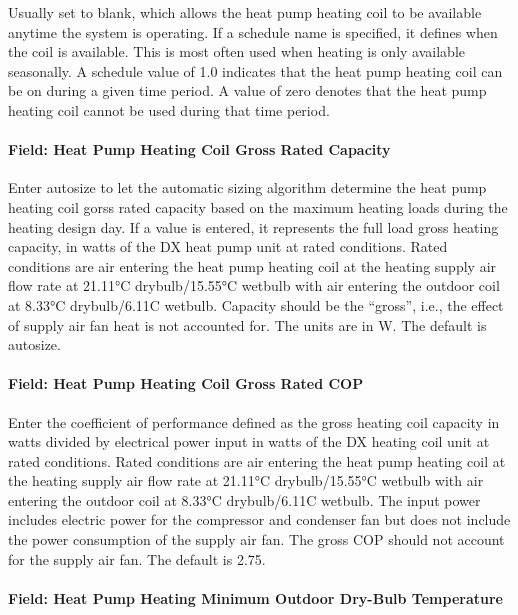 Usually set to blank, which allows the heat pump heating coil to be available anytime the system is operating. If a schedule name is specified, it defines when the coil is available. This is most often used when heating is only available seasonally. A schedule value of 1.0 indicates that the heat pump heating coil can be on during a given time period. A value of zero denotes that the heat pump heating coil cannot be used during that time period.

\paragraph{Field: Heat Pump Heating Coil Gross Rated Capacity}\label{field-heat-pump-heating-coil-gross-rated-capacity}

Enter autosize to let the automatic sizing algorithm determine the heat pump heating coil gorss rated capacity based on the maximum heating loads during the heating design day. If a value is entered, it represents the full load gross heating capacity, in watts of the DX heat pump unit at rated conditions. Rated conditions are air entering the heat pump heating coil at the heating supply air flow rate at 21.11°C drybulb/15.55°C wetbulb with air entering the outdoor coil at 8.33°C drybulb/6.11C wetbulb. Capacity should be the ``gross'', i.e., the effect of supply air fan heat is not accounted for. The units are in W. The default is autosize.

\paragraph{Field: Heat Pump Heating Coil Gross Rated COP}\label{field-heat-pump-heating-coil-gross-rated-cop}

Enter the coefficient of performance defined as the gross heating coil capacity in watts divided by electrical power input in watts of the DX heating coil unit at rated conditions. Rated conditions are air entering the heat pump heating coil at the heating supply air flow rate at 21.11°C drybulb/15.55°C wetbulb with air entering the outdoor coil at 8.33°C drybulb/6.11C wetbulb. The input power includes electric power for the compressor and condenser fan but does not include the power consumption of the supply air fan. The gross COP should not account for the supply air fan. The default is 2.75.

\paragraph{Field: Heat Pump Heating Minimum Outdoor Dry-Bulb Temperature}\label{field-heat-pump-heating-minimum-outdoor-dry-bulb-temperature}

